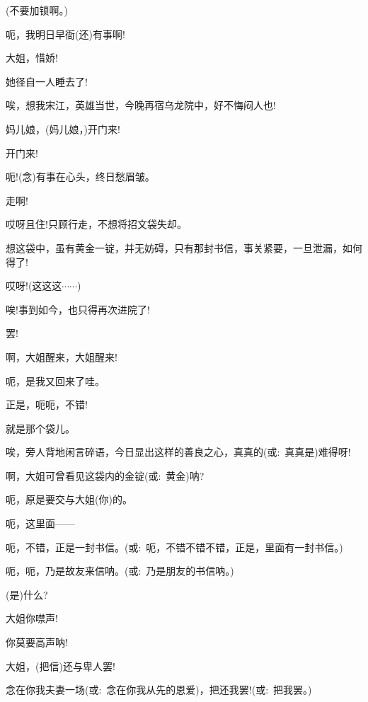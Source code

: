 {{(不要加锁啊。)}

{呃，我明日早衙(还)有事啊!}

{大姐，惜娇!}

{她径自一人睡去了!}

{唉，想我宋江，英雄当世，今晚再宿乌龙院中，好不悔闷人也!}



{妈儿娘，(妈儿娘，)开门来!}

{开门来!}

{呃!({\akai 念})有事在心头，终日愁眉皱。}

{走啊!}

{哎呀且住!只顾行走，不想将招文袋失却。}

{想这袋中，虽有黄金一锭，并无妨碍，只有那封书信，事关紧要，一旦泄漏，如何得了!}

{哎呀!(这这这$\cdots{}\cdots{}$)}

{唉!事到如今，也只得再次进院了!}

{罢!}

{啊，大姐醒来，大姐醒来!}

{呃，是我又回来了哇。}

正是，呃呃，不错!

就是那个袋儿。

唉，旁人背地闲言碎语，今日显出这样的善良之心，真真的({\akai 或}:~真真是)难得呀!

{啊，大姐可曾看见这袋内的金锭({\akai 或}:~黄金){\footnotesize 呐}?}

{呃，原是要交与大姐(你)的。}

{呃，这里面------}

{呃，不错，正是一封书信。({\akai 或}:~呃，不错不错不错，正是，里面有一封书信。)}

{呃，呃，乃是故友来信{\footnotesize 呐}。({\akai 或}:~乃是朋友的书信{\footnotesize 呐}。)}

{(是)什么?}

{大姐你噤声!}

{你莫要高声呐!}

{大姐，(把信)还与卑人罢!}

{念在你我夫妻一场({\akai 或}:~念在你我从先的恩爱)，把还我罢!({\akai 或}:~把我罢。)}

}
